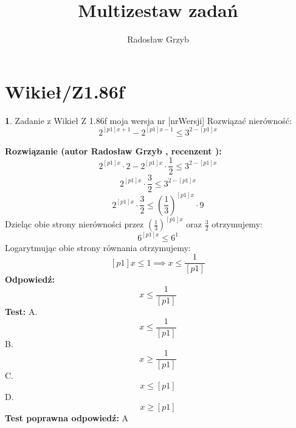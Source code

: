 \documentclass[12pt, a4paper]{article}
\title{Multizestaw zadań}
\author{Radosław Grzyb}
\date{}
\theoremstyle{definition} %
\newtheorem{zad}{}
\newcommand{\kategoria}[1]{\section{#1}} %
\newcommand{\zadStart}[1]{\begin{zad}#1\newline} %
\newcommand{\zadStop}{\end{zad}}   %
\newcommand{\rozwStart}[2]{\noindent \textbf{Rozwiązanie (autor #1 , recenzent #2): }\newline} %
\newcommand{\rozwStop}{\newline}                                            %
\newcommand{\odpStart}{\noindent \textbf{Odpowiedź:}\newline}    %
\newcommand{\odpStop}{\newline}                                             %
\newcommand{\testStart}{\noindent \textbf{Test:}\newline} %
\newcommand{\testStop}{\newline} %
\newcommand{\kluczStart}{\noindent \textbf{Test poprawna odpowiedź:}\newline} %
\newcommand{\kluczStop}{\newline} %
\begin{document}
\maketitle
\kategoria{Wikieł/Z1.86f}
\zadStart{Zadanie z Wikieł Z 1.86f moja wersja nr [nrWersji]}
Rozwiązać nierówność:
$$2^{[p1]x+1}-2^{[p1]x-1}\leq3^{2-[p1]x}$$
\zadStop
\rozwStart{Radosław Grzyb}{}
$$2^{[p1]x}\cdot2-2^{[p1]x}\cdot\frac{1}{2}\leq3^{2-[p1]x}$$
$$2^{[p1]x}\cdot\frac{3}{2}\leq3^{2-[p1]x}$$
$$2^{[p1]x}\cdot\frac{3}{2}\leq\left(\frac{1}{3}\right)^{[p1]x}\cdot9$$
Dzieląc obie strony nierówności przez $\left(\frac{1}{3}\right)^{[p1]x}$ oraz $\frac{3}{2}$ otrzymujemy:
$$6^{[p1]x}\leq6^{1}$$
Logarytmując obie strony równania otrzymujemy:
$$[p1]x\leq1 \implies x\leq\frac{1}{[p1]}$$
\rozwStop
\odpStart
$$x\leq\frac{1}{[p1]}$$
\odpStop
\testStart
A.$$x\leq\frac{1}{[p1]}$$
B.$$x\geq\frac{1}{[p1]}$$
C.$$x \leq [p1]$$
D.$$x \geq [p1]$$
\testStop
\kluczStart
A
\kluczStop
\end{document}
